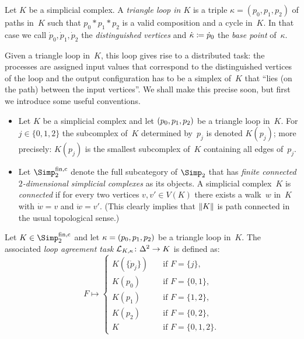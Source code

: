 \begin{thDef}
    Let $K$ be a simplicial complex.
    A \emph{triangle loop in $K$} is a triple $\kappa = (p_0,p_1,p_2)$ of paths
    in~$K$ such that $p_0\ast p_1\ast p_2$ is a valid composition and a cycle
    in~$K$. In that case we call $\dot{p}_0,\dot{p}_1,\dot{p}_2$ the
    \emph{distinguished vertices} and $\dot\kappa \coloneqq \dot{p}_0$ the
    \emph{base point} of~$\kappa$.
\end{thDef}

Given a triangle loop in~$K$, this loop gives rise to a distributed task:
the processes are assigned input values that correspond to the distinguished
vertices of the loop and the output configuration has to be a simplex of~$K$
that \enquote{lies (on the path) between the input vertices}. We shall make this
precise soon, but first we introduce some useful conventions.

\begin{thConvention}\hfill
    \begin{itemize}
        \item
            Let $K$ be a simplicial complex and let $(p_0,p_1,p_2)$ be a triangle loop
            in~$K$. For $j\in\{0,1,2\}$ the subcomplex of~$K$ determined
            by~$p_j$ is denoted $K(p_j)$; more precisely: $K(p_j)$ is the
            smallest subcomplex of~$K$ containing all edges of~$p_j$.
            
        \item
            Let $\finSimp$ denote the full subcategory of $\Simp_2$ that has
            \emph{finite connected $2$-dimensional simplicial complexes} as its
            objects. A simplicial complex~$K$ is \emph{connected} if for
            every two vertices $v,v'\in V(K)$ there exists a walk~$w$ in~$K$
            with $\dot w = v$ and $\ddot w = v'$. (This clearly implies that
            $\lVert K\rVert$ is path connected in the usual topological sense.)
    \end{itemize}
\end{thConvention}

\begin{thDef}
    Let $K\in\finSimp$ and let $\kappa = (p_0,p_1,p_2)$ be a triangle loop in~$K$. The
    associated \emph{loop agreement task $\mathcal{L}_{K,\kappa}\colon\Delta^2 \to K$}
    is defined as:
    \[
        F \mapsto \begin{cases}
            K(\{\dot{p}_j\}) &\quad \text{if } F = \{j\},   \\
            K(p_0)           &\quad \text{if } F = \{0,1\}, \\
            K(p_1)           &\quad \text{if } F = \{1,2\}, \\
            K(p_2)           &\quad \text{if } F = \{0,2\}, \\
            K             &\quad \text{if } F = \{0,1,2\}
        . \end{cases}
    \]
\end{thDef}

